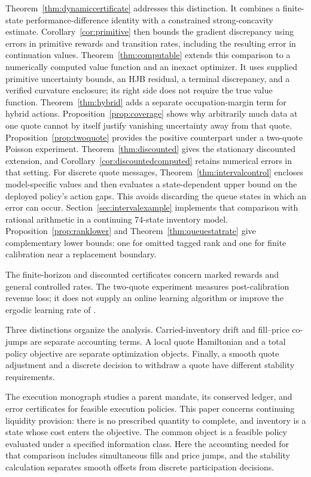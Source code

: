 \documentclass[11pt]{article}
\theoremstyle{plain}
\theoremstyle{definition}
\theoremstyle{remark}
\begin{document}
Theorem~\ref{thm:dynamiccertificate} addresses this
distinction. It combines a finite-state performance-difference identity
with a constrained strong-concavity estimate. Corollary~\ref{cor:primitive}
then bounds the gradient discrepancy using errors in primitive rewards
and transition rates, including the resulting error in continuation
values. Theorem~\ref{thm:computable} extends this comparison to a numerically
computed value function and an inexact optimizer. It uses supplied
primitive uncertainty bounds, an HJB residual, a terminal discrepancy,
and a verified curvature enclosure; its right side does not require
the true value function. Theorem~\ref{thm:hybrid} adds a separate
occupation-margin term for hybrid actions. Proposition~\ref{prop:coverage}
shows why arbitrarily much data at one quote cannot by itself justify
vanishing uncertainty away from that quote. Proposition~\ref{prop:twoquote}
provides the positive counterpart under a two-quote Poisson experiment.
Theorem~\ref{thm:discounted} gives the stationary discounted extension,
and Corollary~\ref{cor:discountedcomputed} retains numerical errors in that
setting. For discrete quote messages, Theorem~\ref{thm:intervalcontrol}
encloses model-specific values and then evaluates a state-dependent
upper bound on the deployed policy's action gaps. This avoids
discarding the queue states in which an error can occur.
Section~\ref{sec:intervalexample} implements that comparison with
rational arithmetic in a continuing 74-state inventory model.
Proposition~\ref{prop:ranklower} and
Theorem~\ref{thm:queuestatrate} give complementary lower bounds:
one for omitted tagged rank and one for finite calibration near
a replacement boundary.

The finite-horizon and discounted certificates concern marked
rewards and general controlled rates. The two-quote experiment measures
post-calibration revenue loss; it does not supply an online learning
algorithm or improve the ergodic learning rate of \citet{CaoEtAl2026}.

Three distinctions organize the analysis. Carried-inventory drift and
fill--price co-jumps are separate accounting terms. A local quote
Hamiltonian and a total policy objective are separate optimization
objects. Finally, a smooth quote adjustment and a discrete decision to
withdraw a quote have different stability requirements.

The execution monograph \citep{NoguerAlonso2026Execution} studies a
parent mandate, its conserved ledger, and error certificates for feasible
execution policies. This paper concerns continuing liquidity provision:
there is no prescribed quantity to complete, and inventory is a state
whose cost enters the objective. The common object is a feasible policy
evaluated under a specified information class. Here the accounting
needed for that comparison includes simultaneous fills and price jumps,
and the stability calculation separates smooth offsets from discrete
participation decisions.
\end{document}
